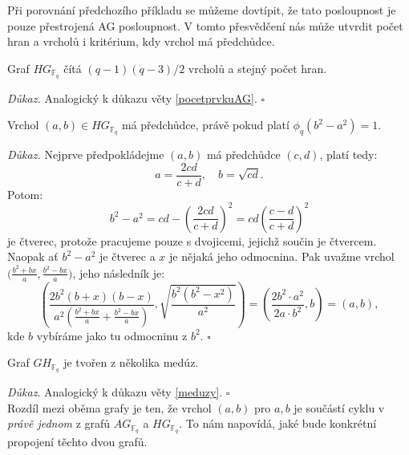 \documentclass[12pt]{report}
\begin{document}
Při porovnání předchozího příkladu se můžeme dovtípit, že tato posloupnost je pouze přestrojená AG posloupnost. V tomto přesvědčení nás může utvrdit počet hran a vrcholů i kritérium, kdy vrchol má předchůdce.

\begin{veta}
Graf $HG_{\mathbb{F}_q}$ čítá $(q-1)(q-3)/2$ vrcholů a stejný počet hran.
\end{veta}
\textit{Důkaz.} Analogický k důkazu věty \ref{pocetprvkuAG}. \hfill $\square$


\begin{lemma}
Vrchol $(a,b) \in HG_{\mathbb{F}_q}$ má předchůdce, právě pokud platí $\phi_q(b^2-a^2)=1$.
\end{lemma}

\noindent \textit{Důkaz.} Nejprve předpokládejme $(a,b)$ má předchůdce $(c,d)$, platí tedy:
\begin{equation*}
a = \frac{2cd}{c+d}, \quad b = \sqrt{cd}.
\end{equation*}
Potom:
\begin{equation*}
b^2-a^2 = cd- \left(\frac{2 cd}{c+d} \right)^2 = cd \left( \frac{c-d}{c+d} \right)^2
\end{equation*}
je čtverec, protože pracujeme pouze s dvojicemi, jejichž součin je čtvercem. Naopak ať $b^2-a^2$ je čtverec a $x$ je nějaká jeho odmocnina. Pak uvažme vrchol $\Big(\frac{b^2+b  x}{a},\frac{b^2-bx}{a} \Big)$, jeho následník je: $$\left(\frac{2 b^2 (b+x)(b-x)}{a^2 \left(\frac{b^2+bx}{a} + \frac{b^2-bx}{a} \right)}, \sqrt{\frac{b^2(b^2-x^2)}{a^2}} \right)= \left(\frac{2 b^2 \cdot a^2}{2 a \cdot b^2 }, b \right) = \left(a, b \right),$$
kde $b$ vybíráme jako tu  odmocninu z $b^2$. \hfill $\square$

\begin{dusledek}
Graf $GH_{\mathbb{F}_q}$ je tvořen z několika medúz.
\end{dusledek}
\noindent \textit{Důkaz}. Analogický k důkazu věty \ref{meduzy}. \hfill $\square$\\

Rozdíl mezi oběma grafy je ten, že vrchol $(a,b)$ pro $a,b$ je součástí cyklu v \textit{právě jednom} z grafů $AG_{\mathbb{F}_q}$ a $HG_{\mathbb{F}_q}$. To nám napovídá, jaké bude konkrétní propojení těchto dvou grafů.
\end{document}
